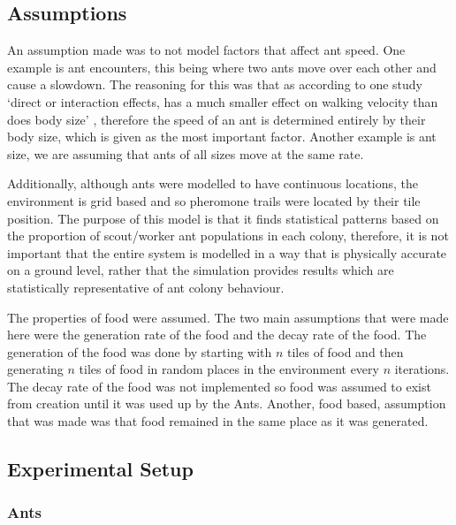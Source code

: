  \subsection{Assumptions}
An assumption made was to not model factors that affect ant speed. One example is ant encounters, this being where two ants move over each other and cause a slowdown. The reasoning for this was that as according to one study `direct or interaction effects, has a much smaller effect on walking velocity than does body size' \cite{Burd2003}, therefore the speed of an ant is determined entirely by their body size, which is given as the most important factor. Another example is ant size, we are assuming that ants of all sizes move at the same rate.\par
Additionally, although ants were modelled to have continuous locations, the environment is grid based and so pheromone trails were located by their tile position. The purpose of this model is that it finds statistical patterns based on the proportion of scout/worker ant populations in each colony, therefore, it is not important that the entire system is modelled in a way that is physically accurate on a ground level, rather that the simulation provides results which are statistically representative of ant colony behaviour.\par 
The properties of food were assumed. The two main assumptions that were made here were the generation rate of the food and the decay rate of the food. The generation of the food was done by starting with $n$ tiles of food and then generating $n$ tiles of food in random places in the environment every $n$ iterations. The decay rate of the food was not implemented so food was assumed to exist from creation until it was used up by the Ants. Another, food based, assumption that was made was that food remained in the same place as it was generated.\par
 
 \subsection{Experimental Setup}
 
 \subsubsection{Ants}
 
